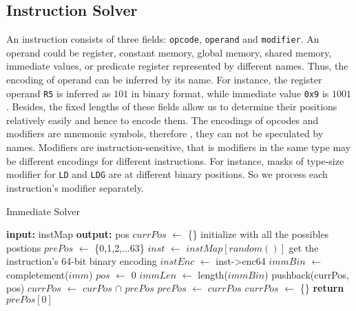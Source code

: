 \subsection{Instruction Solver}


An instruction consists of three fields: {\tt opcode}, {\tt operand} and {\tt modifier}. An operand could be register, 
constant memory, global memory, shared memory, immediate values, or predicate register represented by different names.
Thus, the encoding of operand can be inferred by its name. For instance, the register operand {\tt R5} is
inferred as $101$ in binary format, while immediate value {\tt 0x9} is $1001$. 
Besides, the fixed lengths of these fields allow us to determine their positions  relatively easily and hence to encode them. 
The encodings of opcodes and modifiers are mnemonic symbols, therefore
, they can not be speculated by names. 
Modifiers are instruction-sensitive, that is modifiers in the same type may be different encodings for different instructions. 
For instance, masks of type-size
modifier for {\tt LD} and {\tt LDG} are at different binary positions. So we process each instruction's modifier separately. 


\begin{algorithm}
      \caption{Immediate Solver}
      \label{algo:int_solver}
  \begin{algorithmic}[1]
	  \State \textbf{input:} instMap
      \State \textbf{output:} pos
      \State $currPos$ $\gets$ \{\}
      \LineComment initialize with all the possibles postions
      \State $prePos$ $\gets$ \{0,1,2,...63\}
      \State $inst$ $\gets$ $instMap[random()]$
      \LineComment get the instruction's 64-bit binary encoding
      \State $instEnc$ $\gets$ inst->enc64
      \State $immBin$ $\gets$ completement($imm$)
      \State $pos$ $\gets$ 0
      \State $immLen$ $\gets$ length($immBin$)
      \State pushback(currPos, pos)
      \EndIf
      \EndWhile
      \State $currPos$ $\gets$ $curPos$ $\cap$ $prePos$
      \State $prePos$ $\gets$ $currPos$
      \State $currPos$ $\gets$ \{\}
      \EndWhile
      \State \textbf{return} $prePos[0]$
  \end{algorithmic}
\end{algorithm}

